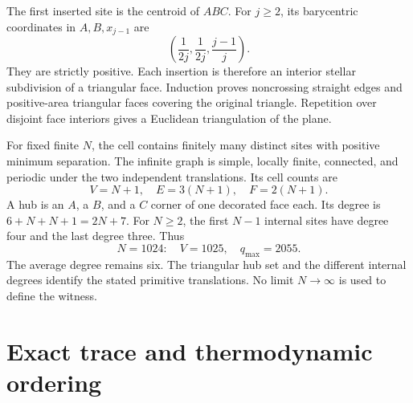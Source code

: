 \documentclass[aps,pre,reprint,amsmath,amssymb,nofootinbib,longbibliography,floatfix]{revtex4-2}
\newcommand{\qm}{q_{\max}}
\begin{document}
The first inserted site is the centroid of \(ABC\). For \(j\geq2\), its barycentric coordinates in \(A,B,x_{j-1}\) are
\begin{equation}
 \left(\frac1{2j},\frac1{2j},\frac{j-1}{j}\right).
\end{equation}
They are strictly positive. Each insertion is therefore an interior stellar subdivision of a triangular face. Induction proves noncrossing straight edges and positive-area triangular faces covering the original triangle. Repetition over disjoint face interiors gives a Euclidean triangulation of the plane.

For fixed finite \(N\), the cell contains finitely many distinct sites with positive minimum separation. The infinite graph is simple, locally finite, connected, and periodic under the two independent translations. Its cell counts are
\begin{equation}
 V=N+1,\quad E=3(N+1),\quad F=2(N+1).
 \label{eq:counts}
\end{equation}
A hub is an \(A\), a \(B\), and a \(C\) corner of one decorated face each. Its degree is \(6+N+N+1=2N+7\). For \(N\geq2\), the first \(N-1\) internal sites have degree four and the last degree three. Thus
\begin{equation}
 N=1024:\quad V=1025,\quad \qm=2055.
 \label{eq:witness}
\end{equation}
The average degree remains six. The triangular hub set and the different internal degrees identify the stated primitive translations. No limit \(N\to\infty\) is used to define the witness.

\section{Exact trace and thermodynamic ordering}
\end{document}
